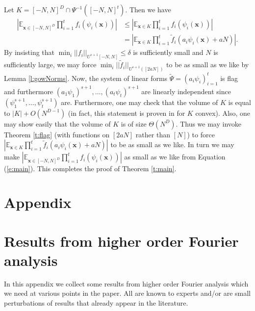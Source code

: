 \documentclass[10pt]{article}
\def\E{\mathbb{E}}
\newcommand{\vect}[1]{\boldsymbol{#1}}
\begin{document}
Let $K = [-N,N]^D \cap \Psi^{-1}([-N,N]^t)$. Then we have 
\begin{align}\label{e:main}
\left|\E_{\vect x \in [-N,N]^D} \prod_{i=1}^t f_i(\psi_i(\vect x))\right| &\leq  \left|\E_{\vect x \in K}\prod_{i=1}^t f_i(\psi_i(\vect x))\right| \nonumber  \\
&=  \left|\E_{\vect x \in K}\prod_{i=1}^t \tilde f_i(a_i\psi_i(\vect x) + aN)\right|.
\end{align}
By insisting that $\min_i||f_i||_{U^{s+1}[-N,N]}\leq \delta $ is sufficiently small and $N$ is sufficiently large, we may force $\min_i||\tilde f_i||_{U^{s+1}([2aN])}$ to be as small as we like by Lemma \ref{l:gowNorms}. Now, the system of linear forms $\tilde \Psi = (a_i\psi_i)_{i=1}^t$ is flag and furthermore $(a_1\psi_1)^{s+1}, \ldots, (a_t\psi_t)^{s+1}$ are linearly independent since $(\psi_1^{s+1}, \ldots, \psi_t^{s+1})$ are. Furthermore, one may check that the volume of $K$ is equal to $|K| + O(N^{D-1})$ (in fact, this statement is proven in \cite[Appendix A]{GT10L} for $K$ convex). Also, one may show easily that the volume of $K$ is of size  $\Theta(N^D)$. Thus we may invoke Theorem \ref{t:flag} (with functions on $[2aN]$ rather than $[N]$) to force $|\E_{\vect x \in K}\prod_{i=1}^t \tilde f_i(a_i\psi_i(\vect x) + aN)|$ to be as small as we like. In turn we may make $|\E_{\vect x \in [-N,N]^D} \prod_{i=1}^t f_i(\psi_i(\vect x))|$ as small as we like from Equation (\ref{e:main}). This completes the proof of Theorem \ref{t:main}.
\appendix %
\section*{Appendix}\section{Results from higher order Fourier analysis}
In this appendix we collect some results from higher order Fourier analysis which we need at various points in the paper. All are known to experts and/or are small perturbations of results that already appear in the literature.
\end{document}
